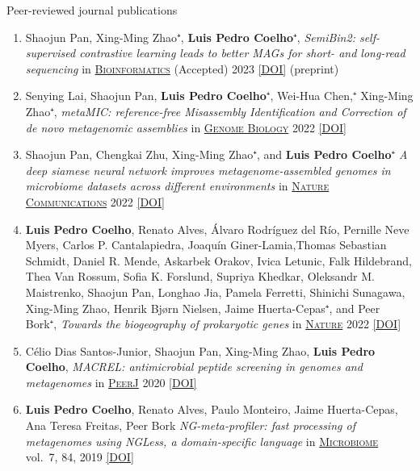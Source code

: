\documentclass{article}
\renewcommand\subsubsection[1]{%
    \par\vspace{.1em}%
    {\hspace{1em}\subsubsubhead #1}%
    \par\vspace{.2em}%
}
\newcommand\showdoi[1]{%
    \href{http://dx.doi.org/#1}{[DOI]}%
}
\newcommand\pubname[1]{\textsc{\uline{#1}}}
\newcommand\contribution[1]{\relax}
\begin{document}
\subsubsection{Peer-reviewed journal publications}

\begin{enumerate}[resume]

\item Shaojun Pan, Xing-Ming Zhao⁺, \textbf{Luis Pedro Coelho}⁺, \emph{SemiBin2: self-supervised contrastive learning leads to better MAGs for short- and long-read sequencing} in \pubname{Bioinformatics} (Accepted) 2023 \showdoi{10.1101/2023.01.09.523201} (preprint)

\item Senying Lai, Shaojun Pan, \textbf{Luis Pedro Coelho}⁺, Wei-Hua Chen,⁺
Xing-Ming Zhao⁺, \emph{metaMIC: reference-free Misassembly Identification and
Correction of de novo metagenomic assemblies} in \pubname{Genome Biology} 2022
\showdoi{10.1186/s13059-022-02810-y}


\item Shaojun Pan, Chengkai Zhu, Xing-Ming Zhao⁺, and \textbf{Luis Pedro
Coelho}⁺ \emph{A deep siamese neural network improves metagenome-assembled
genomes in microbiome datasets across different environments} in
\pubname{Nature Communications} 2022 \showdoi{10.1038/s41467-022-29843-y}

\item \textbf{Luis Pedro Coelho}, Renato Alves, Álvaro Rodríguez del Río,
Pernille Neve Myers, Carlos P. Cantalapiedra, Joaquín Giner-Lamia,Thomas
Sebastian Schmidt, Daniel R. Mende, Askarbek Orakov, Ivica Letunic, Falk
Hildebrand, Thea Van Rossum, Sofia K. Forslund, Supriya Khedkar, Oleksandr M.
Maistrenko, Shaojun Pan, Longhao Jia, Pamela Ferretti, Shinichi Sunagawa,
Xing-Ming Zhao, Henrik Bjørn Nielsen, Jaime Huerta-Cepas⁺, and Peer Bork⁺,
\emph{Towards the biogeography of prokaryotic genes} in \pubname{Nature} 2022
\showdoi{10.1038/s41586-021-04233-4}

\item Célio Dias Santos-Junior, Shaojun Pan, Xing-Ming Zhao, \textbf{Luis Pedro
Coelho}, \emph{MACREL: antimicrobial peptide screening in genomes and
metagenomes} in \pubname{PeerJ} 2020 \showdoi{10.7717/peerj.10555}

\item \textbf{Luis Pedro Coelho}, Renato Alves, Paulo Monteiro, Jaime
Huerta-Cepas, Ana Teresa Freitas, Peer Bork \emph{NG-meta-profiler: fast
processing of metagenomes using NGLess, a domain-specific language} in
\pubname{Microbiome} vol.\ 7, 84, 2019 \showdoi{10.1186/s40168-019-0684-8}
\contribution{I conceived of the concept, co-wrote the software and the manuscript}


\end{enumerate}
\end{document}
